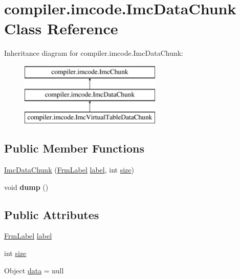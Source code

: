 \hypertarget{classcompiler_1_1imcode_1_1_imc_data_chunk}{}\section{compiler.\+imcode.\+Imc\+Data\+Chunk Class Reference}
\label{classcompiler_1_1imcode_1_1_imc_data_chunk}
Inheritance diagram for compiler.\+imcode.\+Imc\+Data\+Chunk\+:\begin{figure}[H]
\begin{center}
\leavevmode
\includegraphics[height=3.000000cm]{classcompiler_1_1imcode_1_1_imc_data_chunk}
\end{center}
\end{figure}
\subsection*{Public Member Functions}
\begin{DoxyCompactItemize}
\item 
\hyperlink{classcompiler_1_1imcode_1_1_imc_data_chunk_ad83249693211572b2d0a57ea6967d9a8}{Imc\+Data\+Chunk} (\hyperlink{classcompiler_1_1frames_1_1_frm_label}{Frm\+Label} \hyperlink{classcompiler_1_1imcode_1_1_imc_data_chunk_ae3bdb3450a2c71be9415b349d165af3e}{label}, int \hyperlink{classcompiler_1_1imcode_1_1_imc_data_chunk_ad580e546fbdbc7446f513ef1647ffe97}{size})
\item 
\mbox{\label{classcompiler_1_1imcode_1_1_imc_data_chunk_ad3684e2655268947fa795eaf4c2f51df}} 
void {\bfseries dump} ()
\end{DoxyCompactItemize}
\subsection*{Public Attributes}
\begin{DoxyCompactItemize}
\item 
\hyperlink{classcompiler_1_1frames_1_1_frm_label}{Frm\+Label} \hyperlink{classcompiler_1_1imcode_1_1_imc_data_chunk_ae3bdb3450a2c71be9415b349d165af3e}{label}
\item 
int \hyperlink{classcompiler_1_1imcode_1_1_imc_data_chunk_ad580e546fbdbc7446f513ef1647ffe97}{size}
\item 
Object \hyperlink{classcompiler_1_1imcode_1_1_imc_data_chunk_a06d6b7276c9cfb350235f9095ff5d6a8}{data} = null
\end{DoxyCompactItemize}


